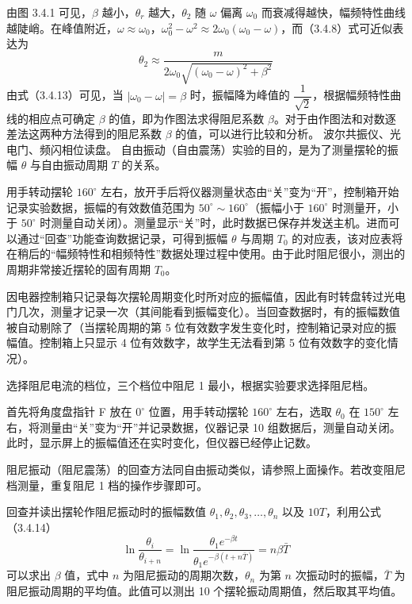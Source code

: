 由图 3.4.1 可见，$\beta$ 越小，$\theta_r$ 越大，$\theta_2$ 随 $\omega$ 偏离 $\omega_0$ 而衰减得越快，幅频特性曲线越陡峭。在峰值附近，$\omega\approx\omega_0$，$\omega_0^2-\omega^2\approx2\omega_0(\omega_0-\omega)$，而（3.4.8）式可近似表达为
\begin{equation}
\theta_2\approx\frac{m}{2\omega_0\sqrt{(\omega_0-\omega)^2+\beta^2}}
\tag{3.4.13}
\end{equation}
由式（3.4.13）可见，当 $|\omega_0-\omega|=\beta$ 时，振幅降为峰值的 $\dfrac{1}{\sqrt{2}}$，根据幅频特性曲线的相应点可确定 $\beta$ 的值，即为作图法求得阻尼系数 $\beta$。对于由作图法和对数逐差法这两种方法得到的阻尼系数 $\beta$ 的值，可以进行比较和分析。
波尔共振仪、光电门、频闪相位读盘。
自由振动（自由震荡）实验的目的，是为了测量摆轮的振幅 $\theta$ 与自由振动周期 $T$ 的关系。

用手转动摆轮 $160^\circ$ 左右，放开手后将仪器测量状态由“关”变为“开”，控制箱开始记录实验数据，振幅的有效数值范围为 $50^\circ\sim160^\circ$（振幅小于 $160^\circ$ 时测量开，小于 $50^\circ$ 时测量自动关闭）。测量显示“关”时，此时数据已保存并发送主机。进而可以通过“回查”功能查询数据记录，可得到振幅 $\theta$ 与周期 $T_0$ 的对应表，该对应表将在稍后的“幅频特性和相频特性”数据处理过程中使用。由于此时阻尼很小，测出的周期非常接近摆轮的固有周期 $T_0$。

因电器控制箱只记录每次摆轮周期变化时所对应的振幅值，因此有时转盘转过光电门几次，测量才记录一次（其间能看到振幅变化）。当回查数据时，有的振幅数值被自动剔除了（当摆轮周期的第 5 位有效数字发生变化时，控制箱记录对应的振幅值。控制箱上只显示 4 位有效数字，故学生无法看到第 5 位有效数字的变化情况）。

选择阻尼电流的档位，三个档位中阻尼 1 最小，根据实验要求选择阻尼档。

首先将角度盘指针 F 放在 $0^\circ$ 位置，用手转动摆轮 $160^\circ$ 左右，选取 $\theta_0$ 在 $150^\circ$ 左右，将测量由“关”变为“开”并记录数据，仪器记录 10 组数据后，测量自动关闭。此时，显示屏上的振幅值还在实时变化，但仪器已经停止记数。

阻尼振动（阻尼震荡）的回查方法同自由振动类似，请参照上面操作。若改变阻尼档测量，重复阻尼 1 档的操作步骤即可。

回查并读出摆轮作阻尼振动时的振幅数值 $\theta_1,\theta_2,\theta_3,\ldots,\theta_n$ 以及 $10T$，利用公式（3.4.14）
\begin{equation}
\ln\frac{\theta_i}{\theta_{i+n}}
=\ln\frac{\theta_1 e^{-\beta t}}{\theta_1 e^{-\beta(t+n\bar T)}}
=n\beta\bar T
\tag{3.4.14}
\end{equation}
可以求出 $\beta$ 值，式中 $n$ 为阻尼振动的周期次数，$\theta_n$ 为第 $n$ 次振动时的振幅，$\bar T$ 为阻尼振动周期的平均值。此值可以测出 10 个摆轮振动周期值，然后取其平均值。

